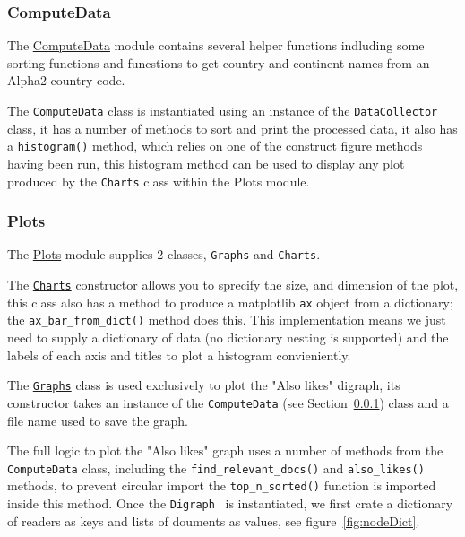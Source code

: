 \documentclass[11pt]{article}
\newcommand{\code}[1]{\colorbox{light-gray}{\texttt{#1}}}
\begin{document}
\subsubsection{ComputeData}\label{subsec:ComputeData}
The \href{https://www2.macs.hw.ac.uk/~sf52/DocuTrace/html/DocuTrace.Analysis.html#module-DocuTrace.Analysis.ComputeData}{ComputeData} module contains several helper functions indluding some sorting functions and funcstions to get country and continent names from an Alpha2 country code.

The \code{ComputeData} class is instantiated using an instance of the \code{DataCollector} class, it has a number of methods to sort and print the processed data, it also has a \code{histogram()} method, which relies on one of the construct figure methods having been run, this histogram method can be used to display any plot produced by the \code{Charts} class within the Plots module.

\subsubsection{Plots}
The \href{https://www2.macs.hw.ac.uk/~sf52/DocuTrace/html/DocuTrace.Analysis.html#module-DocuTrace.Analysis.Plots}{Plots} module supplies 2 classes, \code{Graphs} and \code{Charts}. 

The \href{https://www2.macs.hw.ac.uk/~sf52/DocuTrace/html/DocuTrace.Analysis.html#DocuTrace.Analysis.Plots.Charts}{\code{Charts}} constructor allows you to sprecify the size, and dimension of the plot, this class also has a method to produce a matplotlib \code{ax} object from a dictionary; the \code{ax\_bar\_from\_dict()} method does this. 
This implementation means we just need to supply a dictionary of data (no dictionary nesting is supported) and the labels of each axis and titles to plot a histogram convieniently.

The \href{https://www2.macs.hw.ac.uk/~sf52/DocuTrace/html/DocuTrace.Analysis.html#DocuTrace.Analysis.Plots.Graphs}{\code{Graphs}} class is used exclusively to plot the "Also likes" digraph, its constructor takes an instance of the \code{ComputeData} (see Section~\ref{subsec:ComputeData}) class and a file name used to save the graph.

The full logic to plot the "Also likes" graph uses a number of methods from the \code{ComputeData} class, including the \code{find\_relevant\_docs()} and \code{also\_likes()} methods, to prevent circular import the \code{top\_n\_sorted()} function is imported inside this method.
Once the \code{Digraph}~\autocite{APIReferenceGraphviz} is instantiated, we first crate a dictionary of readers as keys and lists of douments as values, see figure~\ref{fig:nodeDict}.
\end{document}
